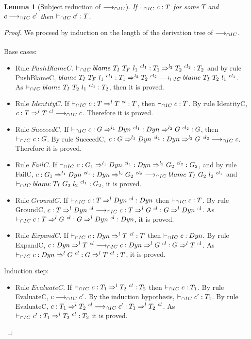 \documentclass[a4paper]{article}
\newtheorem{lemma}{Lemma}
\begin{document}
\begin{lemma}[Subject reduction of $\longrightarrow_{\cap IC}$]
\label{subjectreductionIC}
If $\vdash_{\cap IC} c : T$ for some $T$ and $c \longrightarrow_{\cap IC} c'$ then $\vdash_{\cap IC} c' : T$.
\end{lemma}
\begin{proof}
We proceed by induction on the length of the derivation tree of $\longrightarrow_{\cap IC}$.\\\\
Base cases:
\begin{itemize}
    \item Rule $PushBlameC$.
    $\vdash_{\cap IC} blame\ T_I\ T_F\ l_1\ ^{cl_1} : T_1 \Rightarrow^{l_2} T_2\ ^{cl_2} : T_2$ and by rule PushBlameC, $blame\ T_I\ T_F\ l_1\ ^{cl_1} : T_1 \Rightarrow^{l_2} T_2\ ^{cl_2} \longrightarrow_{\cap IC} blame\ T_I\ T_2\ l_1\ ^{cl_1}$.
    As $\vdash_{\cap IC} blame\ T_I\ T_2\ l_1\ ^{cl_1} : T_2$, then it is proved.
    \item Rule $IdentityC$.
    If $\vdash_{\cap IC} c : T \Rightarrow^l T\ ^{cl} : T$, then $\vdash_{\cap IC} c : T$.
    By rule IdentityC, $c : T \Rightarrow^l T\ ^{cl} \longrightarrow_{\cap IC} c$.
    Therefore it is proved.
    \item Rule $SucceedC$.
    If $\icts c : G \Rightarrow^{l_1} \Dyn\ ^{cl_1} : \Dyn \Rightarrow^{l_2} G\ ^{cl_2} : G$, then $\vdash_{\cap IC} c : G$.
    By rule SucceedC, $c : G \Rightarrow^{l_1} Dyn\ ^{cl_1} : Dyn \Rightarrow^{l_2} G\ ^{cl_2} \longrightarrow_{\cap IC} c$.
    Therefore it is proved.
    \item Rule $FailC$.
    If $\icts c : G_1 \Rightarrow^{l_1} \Dyn\ ^{cl_1} : \Dyn \Rightarrow^{l_2} G_2\ ^{cl_2} : G_2$, and by rule FailC, $c : G_1 \Rightarrow^{l_1} \Dyn\ ^{cl_1} : \Dyn \Rightarrow^{l_2} G_2\ ^{cl_2} \icos \blamecast{T_I}{G_2}{l_2}{cl_1}$ and $\vdash_{\cap IC} blame\ T_I\ G_2\ l_2\ ^{cl_1} : G_2$, it is proved.
    \item Rule $GroundC$.
    If $\vdash_{\cap IC} c : T \Rightarrow^l Dyn\ ^{cl} : Dyn$ then $\vdash_{\cap IC} c : T$.
    By rule GroundC, $c : T \Rightarrow^l \Dyn\ ^{cl} \icos c : T \Rightarrow^l G\ ^{cl} : G \Rightarrow^l \Dyn\ ^{cl}$.
    As $\vdash_{\cap IC} c : T \Rightarrow^l G\ ^{cl} : G \Rightarrow^l Dyn\ ^{cl} : Dyn$, it is proved.
    \item Rule $ExpandC$.
    If $\vdash_{\cap IC} c : Dyn \Rightarrow^l T\ ^{cl} : T$ then $\vdash_{\cap IC} c : Dyn$.
    By rule ExpandC, $c : \Dyn \Rightarrow^l T\ ^{cl} \icos c : \Dyn \Rightarrow^l G\ ^{cl} : G \Rightarrow^l T\ ^{cl}$.
    As $\vdash_{\cap IC} c : Dyn \Rightarrow^l G\ ^{cl} : G \Rightarrow^l T\ ^{cl} : T$, it is proved.
\end{itemize}
Induction step:
\begin{itemize}
    \item Rule $EvaluateC$.
    If $\vdash_{\cap IC} c : T_1 \Rightarrow^l T_2\ ^{cl} : T_2$ then $\vdash_{\cap IC} c : T_1$.
    By rule EvaluateC, $c \longrightarrow_{\cap IC} c'$.
    By the induction hypothesis, $\vdash_{\cap IC} c' : T_1$.
    By rule EvaluateC, $c : T_1 \Rightarrow^l T_2\ ^{cl} \icos c' : T_1 \Rightarrow^l T_2\ ^{cl}$.
    As $\vdash_{\cap IC} c' : T_1 \Rightarrow^l T_2\ ^{cl} : T_2$ it is proved.
\end{itemize}
\end{proof}
\end{document}
